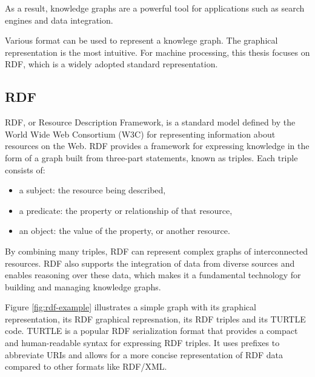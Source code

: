 As a result, knowledge graphs are a powerful tool for applications such as search engines and data integration. %

Various format can be used to represent a knowlege graph. The graphical representation is the most intuitive. For machine processing, this thesis focuses on RDF, which is a widely adopted standard representation. 

\subsection{RDF}

RDF, or Resource Description Framework, is a standard model defined by the World Wide Web Consortium (W3C) for representing information about resources on the Web. RDF provides a framework for expressing knowledge in the form of a graph built from three-part statements, known as triples. Each triple consists of:
\begin{itemize}
  \item a subject: the resource being described,
  \item a predicate: the property or relationship of that resource,
  \item an object: the value of the property, or another resource.
\end{itemize}

By combining many triples, RDF can represent complex graphs of interconnected resources. RDF also supports the integration of data from diverse sources and enables reasoning over these data, which makes it a fundamental technology for building and managing knowledge graphs.

Figure \ref{fig:rdf-example} illustrates a simple graph with its graphical representation, its RDF graphical represnation, its RDF triples and its TURTLE code. TURTLE is a popular RDF serialization format that provides a compact and human-readable syntax for expressing RDF triples. It uses prefixes to abbreviate URIs and allows for a more concise representation of RDF data compared to other formats like RDF/XML.



